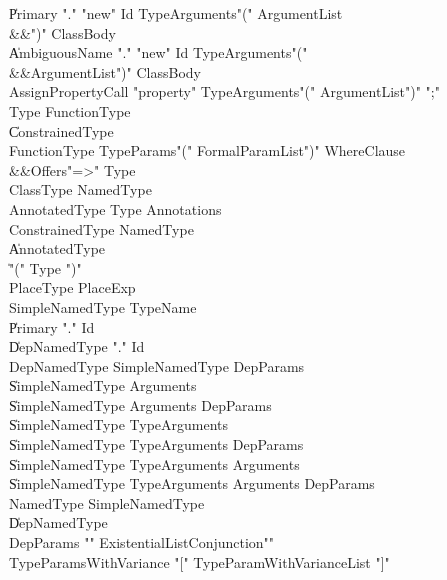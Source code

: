 \begin{grammar}

    \|   Primary  \xcd"."  \xcd"new"  Id  TypeArguments\opt  \xcd"("  ArgumentList\opt\\
          &&\xcd")"  ClassBody\opt\\
    \|   AmbiguousName  \xcd"."  \xcd"new"  Id  TypeArguments\opt  \xcd"("\\
          &&ArgumentList\opt  \xcd")"  ClassBody\opt\\
 AssignPropertyCall  \:   \xcd"property"  TypeArguments\opt  \xcd"("  ArgumentList\opt  \xcd")"  \xcd";"\\
 Type  \:   FunctionType\\
    \|   ConstrainedType\\
 FunctionType  \:   TypeParams\opt  \xcd"("  FormalParamList\opt  \xcd")"  WhereClause\opt\\
          &&Offers\opt  \xcd"=>"  Type\\
 ClassType  \:   NamedType\\
 AnnotatedType  \:   Type  Annotations\\
 ConstrainedType  \:   NamedType\\
    \|   AnnotatedType\\
    \|   \xcd"("  Type  \xcd")"\\
 PlaceType  \:   PlaceExp\\
 SimpleNamedType  \:   TypeName\\
    \|   Primary  \xcd"."  Id\\
    \|   DepNamedType  \xcd"."  Id\\
 DepNamedType  \:   SimpleNamedType  DepParams\\
    \|   SimpleNamedType  Arguments\\
    \|   SimpleNamedType  Arguments  DepParams\\
    \|   SimpleNamedType  TypeArguments\\
    \|   SimpleNamedType  TypeArguments  DepParams\\
    \|   SimpleNamedType  TypeArguments  Arguments\\
    \|   SimpleNamedType  TypeArguments  Arguments  DepParams\\
 NamedType  \:   SimpleNamedType\\
    \|   DepNamedType\\
 DepParams  \:   \xcd"{"  ExistentialList\opt  Conjunction\opt  \xcd"}"\\
 TypeParamsWithVariance  \:   \xcd"["  TypeParamWithVarianceList  \xcd"]"\\

\end{grammar}
